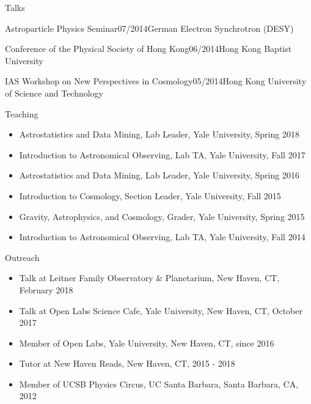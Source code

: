 \documentclass[11pt]{resume} %
\begin{document}
\begin{rSection}{Talks}
\begin{adjustwidth}{0.5cm}{}
    \begin{rSubsection}{Astroparticle Physics Seminar}{07/2014}{German Electron Synchrotron (DESY)}{}\end{rSubsection}

    \begin{rSubsection}{Conference of the Physical Society of Hong Kong}{06/2014}{Hong Kong Baptist University}{}\end{rSubsection}

    \begin{rSubsection}{IAS Workshop on New Perspectives in Cosmology}{05/2014}{Hong Kong University of Science and Technology}{}\end{rSubsection}
  \end{adjustwidth}
\end{rSection}


\begin{rSection}{Teaching}
  \begin{itemize}[leftmargin=1.0cm, topsep=0pt,itemsep=0pt,partopsep=0pt, parsep=0pt]
    \item Astrostatistics and Data Mining, Lab Leader, Yale University, Spring 2018
    \item Introduction to Astronomical Observing, Lab TA, Yale University, Fall 2017
    \item Astrostatistics and Data Mining, Lab Leader, Yale University, Spring 2016
    \item Introduction to Cosmology, Section Leader, Yale University, Fall 2015
    \item Gravity, Astrophysics, and Cosmology, Grader, Yale University, Spring 2015
    \item Introduction to Astronomical Observing, Lab TA, Yale University, Fall 2014
  \end{itemize}
\end{rSection}

\begin{rSection}{Outreach}
  \begin{itemize}[leftmargin=1.0cm, topsep=0pt,itemsep=0pt,partopsep=0pt, parsep=0pt]
    \item Talk at Leitner Family Observatory \& Planetarium, New Haven, CT, February 2018
    \item Talk at Open Labs Science Cafe, Yale University, New Haven, CT, October 2017
    \item Member of Open Labs, Yale University, New Haven, CT, since 2016
    \item Tutor at New Haven Reads, New Haven, CT, 2015 - 2018
    \item Member of UCSB Physics Circus, UC Santa Barbara, Santa Barbara, CA, 2012
  \end{itemize}
\end{rSection}
\end{document}
